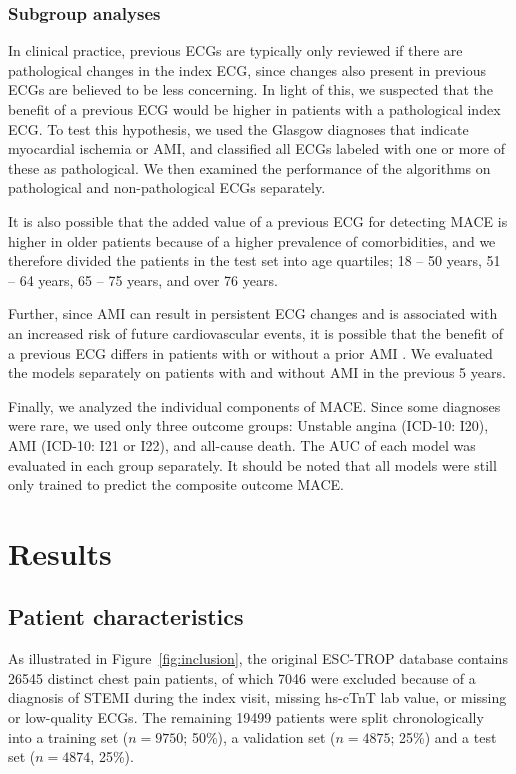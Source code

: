 \documentclass[preprint]{elsarticle}
\begin{document}
\subsubsection{Subgroup analyses}
In clinical practice, previous ECGs are typically only reviewed if there are pathological changes in the index ECG, since changes also present in previous ECGs are believed to be less concerning. In light of this, we suspected that the benefit of a previous ECG would be higher in patients with a pathological index ECG. To test this hypothesis, we used the Glasgow diagnoses that indicate myocardial ischemia or AMI, and classified all ECGs labeled with one or more of these as pathological. We then examined the performance of the algorithms on pathological and non-pathological ECGs separately.

It is also possible that the added value of a previous ECG for detecting MACE is higher in older patients because of a higher prevalence of comorbidities, and we therefore divided the patients in the test set into age quartiles; 18 -- 50 years, 51 -- 64 years, 65 -- 75 years, and over 76 years.

Further, since AMI can result in persistent ECG changes and is associated with an increased risk of future cardiovascular events, it is possible that the benefit of a previous ECG differs in patients with or without a prior AMI \citep{strom2007,sawai2017}. We evaluated the models separately on patients with and without AMI in the previous 5 years.

Finally, we analyzed the individual components of MACE. Since some diagnoses were rare, we used only three outcome groups: Unstable angina (ICD-10: I20), AMI (ICD-10: I21 or I22), and all-cause death. The AUC of each model was evaluated in each group separately. It should be noted that all models were still only trained to predict the composite outcome MACE.

\section{Results}
\subsection{Patient characteristics}
\label{sec:patient_characteristics}
As illustrated in Figure~\ref{fig:inclusion}, the original ESC-TROP database contains 26545 distinct chest pain patients, of which 7046 were excluded because of a diagnosis of STEMI during the index visit, missing hs-cTnT lab value, or missing or low-quality ECGs. The remaining 19499 patients were split chronologically into a training set ($n=9750$; 50\%), a validation set ($n=4875$; 25\%) and a test set ($n=4874$, 25\%).
\end{document}
